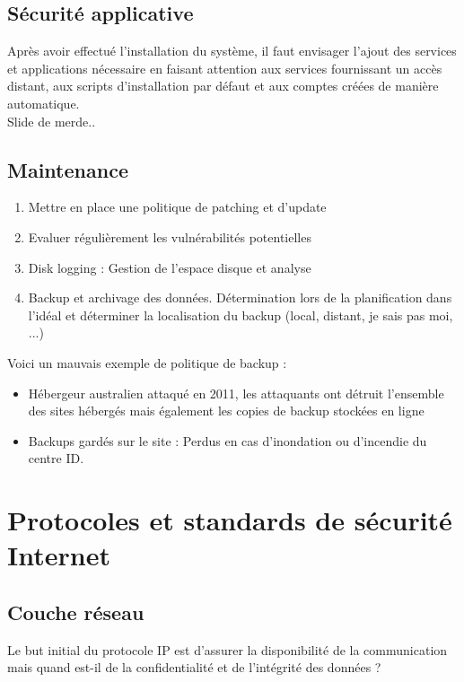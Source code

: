 \documentclass{report}
\begin{document}
\section{Sécurité applicative}

Après avoir effectué l'installation du système, il faut envisager l'ajout des services et applications nécessaire en faisant attention aux services fournissant un accès distant, aux scripts d'installation par défaut et aux comptes créées de manière automatique.\\

Slide de merde..

\section{Maintenance}

\begin{enumerate}
    \item Mettre en place une politique de patching et d'update
    \item Evaluer régulièrement les vulnérabilités potentielles
    \item Disk logging : Gestion de l'espace disque et analyse
    \item Backup et archivage des données. Détermination lors de la planification dans l'idéal et déterminer la localisation du backup (local, distant, je sais pas moi, ...)
\end{enumerate}

Voici un mauvais exemple de politique de backup :
\begin{itemize}
    \item Hébergeur australien attaqué en 2011, les attaquants ont détruit l’ensemble des sites hébergés mais également les copies de backup stockées en ligne
    \item Backups gardés sur le site : Perdus en cas d’inondation ou d’incendie du centre ID.
\end{itemize}


\chapter{Protocoles et standards de sécurité Internet}

\section{Couche réseau}

Le but initial du protocole IP est d'assurer la disponibilité de la communication mais quand est-il de la confidentialité et de l'intégrité des données ?
\end{document}
